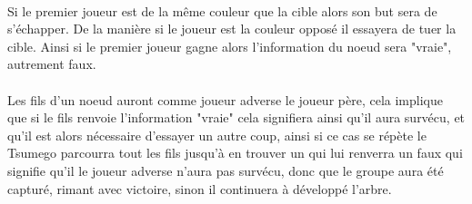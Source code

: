             \paragraph{}Si le premier joueur est de la même couleur que la cible alors son but sera de s'échapper. De la manière si le joueur est la couleur opposé il essayera de tuer la cible. 
            Ainsi si le premier joueur gagne alors l'information du noeud sera "vraie", autrement faux.
            
            \paragraph{}Les fils d'un noeud auront comme joueur adverse le joueur père, cela implique que si le fils renvoie l'information "vraie" cela signifiera ainsi qu'il aura survécu, et qu'il est alors nécessaire d'essayer un autre coup, ainsi si ce cas se répète le Tsumego parcourra tout les fils jusqu'à en trouver un qui lui renverra un faux qui signifie qu'il le joueur adverse n'aura pas survécu, donc que le groupe aura été capturé, rimant avec victoire, sinon il continuera à développé l'arbre.
            
